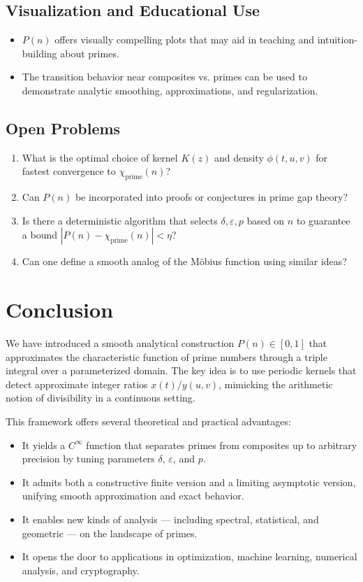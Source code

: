 \documentclass[12pt]{article}
\theoremstyle{definition}
\theoremstyle{plain}
\theoremstyle{remark}
\begin{document}
\subsection{Visualization and Educational Use}

\begin{itemize}
  \item \( P(n) \) offers visually compelling plots that may aid in teaching and intuition-building about primes.
  \item The transition behavior near composites vs. primes can be used to demonstrate analytic smoothing, approximations, and regularization.
\end{itemize}

\subsection{Open Problems}

\begin{enumerate}
  \item What is the optimal choice of kernel \( K(z) \) and density \( \phi(t,u,v) \) for fastest convergence to \( \chi_{\mathrm{prime}}(n) \)?
  \item Can \( P(n) \) be incorporated into proofs or conjectures in prime gap theory?
  \item Is there a deterministic algorithm that selects \( \delta, \varepsilon, p \) based on \( n \) to guarantee a bound \( |P(n) - \chi_{\mathrm{prime}}(n)| < \eta \)?
  \item Can one define a smooth analog of the Möbius function using similar ideas?
\end{enumerate}

\section{Conclusion}

We have introduced a smooth analytical construction \( P(n) \in [0,1] \) that approximates the characteristic function of prime numbers through a triple integral over a parameterized domain. The key idea is to use periodic kernels that detect approximate integer ratios \( x(t)/y(u,v) \), mimicking the arithmetic notion of divisibility in a continuous setting.

This framework offers several theoretical and practical advantages:
\begin{itemize}
  \item It yields a \( C^\infty \) function that separates primes from composites up to arbitrary precision by tuning parameters \( \delta \), \( \varepsilon \), and \( p \).
  \item It admits both a constructive finite version and a limiting asymptotic version, unifying smooth approximation and exact behavior.
  \item It enables new kinds of analysis — including spectral, statistical, and geometric — on the landscape of primes.
  \item It opens the door to applications in optimization, machine learning, numerical analysis, and cryptography.
\end{itemize}
\end{document}
